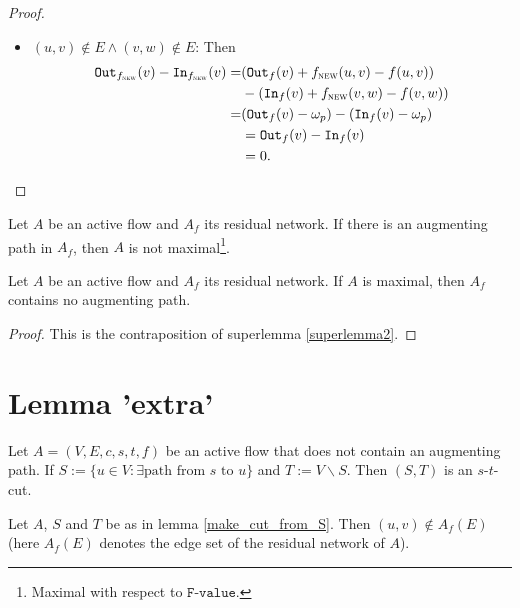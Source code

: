 \documentclass{article}
\begin{document}
\begin{proof}
\begin{itemize}
        \item $(u, v) \not\in E \wedge (v, w) \not\in E$: Then \begin{align*}
            \texttt{Out}_{f_{\textsc{new}}}(v) - \texttt{In}_{f_{\textsc{new}}}(v) =& (\texttt{Out}_{f}(v)+f_{\textsc{new}}(u, v) - f(u, v))\\
            &- (\texttt{In}_{f}(v)+f_{\textsc{new}}(v, w) - f(v, w))\\
            =& (\texttt{Out}_{f}(v)-\omega_p) - (\texttt{In}_{f}(v)-\omega_p)\\
            &= \texttt{Out}_{f}(v)- \texttt{In}_{f}(v)\\
            &= 0.
        \end{align*}
    \end{itemize}
\end{proof}


\begin{superlemma}\label{superlemma2}
    Let $A$ be an active flow and $A_f$ its residual network. If there is an augmenting path in $A_f$, then $A$ is not maximal\footnote{Maximal with respect to $\texttt{F-value}.$}.
\end{superlemma}

\begin{foljdsats}
    Let $A$ be an active flow and $A_f$ its residual network. If $A$ is maximal, then $A_f$ contains no augmenting path.
\end{foljdsats}
\begin{proof}
    This is the contraposition of superlemma \ref{superlemma2}.
\end{proof}



\section{Lemma 'extra'}
\begin{lemma}\label{make_cut_from_S}
    Let $A=(V, E, c, s, t, f)$ be an active flow that does not contain an augmenting path. If $S := \{u \in V: \exists \text{path from $s$ to $u$}\}$ and $T := V \backslash S$. Then $(S, T)$ is an $s$-$t$-cut.
\end{lemma}

\begin{lemma}
    Let $A$, $S$ and $T$ be as in lemma \ref{make_cut_from_S}. Then $(u, v) \not\in A_f(E)$ (here $A_f(E)$ denotes the edge set of the residual network of $A$).
\end{lemma}
\end{document}
